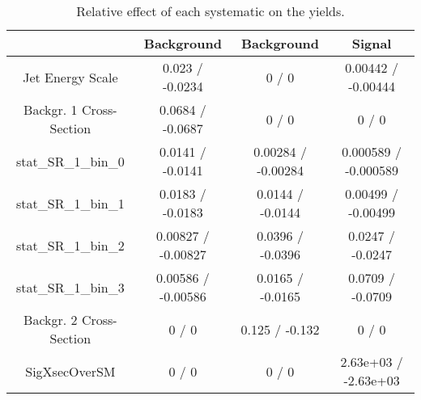 \documentclass[10pt]{article}
\begin{document}
\begin{table}[htbp]
\begin{center}
\begin{tabular}{|c|c|c|c|}
\hline 
      & Background      & Background      & Signal \\ 
\hline 
  Jet Energy Scale & 0.023 / -0.0234 & 0 / 0 & 0.00442 / -0.00444 \\ 
  Backgr. 1 Cross-Section & 0.0684 / -0.0687 & 0 / 0 & 0 / 0 \\ 
 stat_SR_1_bin_0 & 0.0141 / -0.0141 & 0.00284 / -0.00284 & 0.000589 / -0.000589 \\ 
 stat_SR_1_bin_1 & 0.0183 / -0.0183 & 0.0144 / -0.0144 & 0.00499 / -0.00499 \\ 
 stat_SR_1_bin_2 & 0.00827 / -0.00827 & 0.0396 / -0.0396 & 0.0247 / -0.0247 \\ 
 stat_SR_1_bin_3 & 0.00586 / -0.00586 & 0.0165 / -0.0165 & 0.0709 / -0.0709 \\ 
  Backgr. 2 Cross-Section & 0 / 0 & 0.125 / -0.132 & 0 / 0 \\ 
 SigXsecOverSM & 0 / 0 & 0 / 0 & 2.63e+03 / -2.63e+03 \\ 
\hline 
\end{tabular} 
\caption{Relative effect of each systematic on the yields.} 
\end{center} 
\end{table} 
\end{document}
